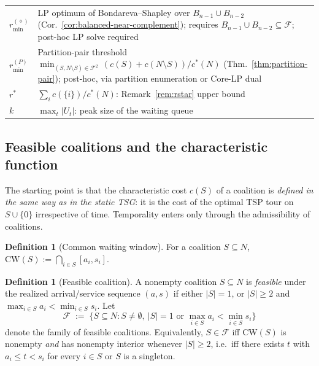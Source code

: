\documentclass[11pt]{article}
\theoremstyle{plain}
\theoremstyle{definition}
\newtheorem{definition}[theorem]{Definition}
\theoremstyle{remark}
\newcommand{\F}{\mathcal{F}}
\newcommand{\CW}{\mathrm{CW}}
\newcommand{\cstar}{c^{\ast}}
\begin{document}
\begin{table}[t]
\begin{tabular}{@{}lp{}@{}}
$r^{(\diamond)}_{\min}$ & LP optimum of Bondareva--Shapley over $B_{n-1}\cup B_{n-2}$ (Cor.~\ref{cor:balanced-near-complement}); requires $B_{n-1}\cup B_{n-2}\subseteq\F$; post-hoc LP solve required \\
$r^{(P)}_{\min}$ & Partition-pair threshold $\min_{(S,N\setminus S)\in\F^{2}}\,(c(S)+c(N\setminus S))/\cstar(N)$ (Thm.~\ref{thm:partition-pair}); post-hoc, via partition enumeration or Core-LP dual \\
$r^{\ast}$ & $\sum_i c(\{i\})/\cstar(N)$: Remark~\ref{rem:rstar} upper bound \\
$k$ & $\max_t |U_t|$: peak size of the waiting queue \\
\bottomrule
\end{tabular}
\end{table}

\subsection{Feasible coalitions and the characteristic function}

The starting point is that the characteristic cost $c(S)$ of a coalition is \emph{defined in the same way as in the static TSG}: it is the cost of the optimal TSP tour on $S\cup\{0\}$ irrespective of time. Temporality enters only through the admissibility of coalitions.

\begin{definition}[Common waiting window]
\label{def:cw}
For a coalition $S\subseteq N$,
$\CW(S) := \bigcap_{i\in S} [a_i, s_i]$.
\end{definition}

\begin{definition}[Feasible coalition]
\label{def:feasible}
A nonempty coalition $S\subseteq N$ is \emph{feasible} under the realized arrival/service sequence $(a, s)$ if either $|S|=1$, or $|S|\ge 2$ and $\max_{i\in S} a_i < \min_{i\in S} s_i$. Let
\[
\F \;:=\; \bigl\{S\subseteq N : S\neq\emptyset,\ \text{$|S|=1$ or } \max_{i\in S} a_i < \min_{i\in S} s_i\bigr\}
\]
denote the family of feasible coalitions. Equivalently, $S\in\F$ iff $\CW(S)$ is nonempty \emph{and} has nonempty interior whenever $|S|\ge 2$, i.e.\ iff there exists $t$ with $a_i\le t<s_i$ for every $i\in S$ or $S$ is a singleton.
\end{definition}
\end{document}
